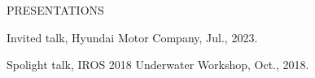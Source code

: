 \begin{rSection}{PRESENTATIONS}{}{}{}        
    \begin{rSubsection}{}{}{}{}    
        \item Invited talk, Hyundai Motor Company, Jul., 2023.
        \item Spolight talk, IROS 2018 Underwater Workshop, Oct., 2018.
     \end{rSubsection}         
 \end{rSection}

